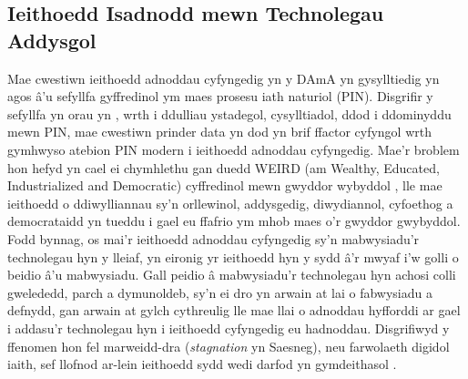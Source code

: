 \subsection{Ieithoedd Isadnodd mewn Technolegau Addysgol}
Mae cwestiwn ieithoedd adnoddau cyfyngedig yn y DAmA yn gysylltiedig yn agos â'u sefyllfa gyffredinol ym maes prosesu iath naturiol (PIN). Disgrifir y sefyllfa yn orau yn \textcite{magueresse_low-resource_2020}, wrth i ddulliau ystadegol, cysylltiadol, ddod i ddominyddu mewn PIN, mae cwestiwn prinder data yn dod yn brif ffactor cyfyngol wrth gymhwyso atebion PIN modern i ieithoedd adnoddau cyfyngedig. Mae'r broblem hon hefyd yn cael ei chymhlethu gan duedd WEIRD (am Wealthy, Educated, Industrialized and Democratic) cyffredinol mewn gwyddor wybyddol \parencite{henrich_most_2010}, lle mae ieithoedd o ddiwylliannau sy'n orllewinol, addysgedig, diwydiannol, cyfoethog a democrataidd yn tueddu i gael eu ffafrio ym mhob maes o'r gwyddor gwybyddol. Fodd bynnag, os mai'r ieithoedd adnoddau cyfyngedig sy'n mabwysiadu'r technolegau hyn y lleiaf, yn eironig yr ieithoedd hyn y sydd â'r mwyaf i'w golli o beidio â'u mabwysiadu. Gall peidio â mabwysiadu'r technolegau hyn achosi colli gwelededd, parch a dymunoldeb, sy'n ei dro yn arwain at lai o fabwysiadu a defnydd, gan arwain at gylch cythreulig lle mae llai o adnoddau hyfforddi ar gael i addasu'r technolegau hyn i ieithoedd cyfyngedig eu hadnoddau. Disgrifiwyd y ffenomen hon fel marweidd-dra (\textit{stagnation} yn Saesneg), neu farwolaeth digidol iaith, sef llofnod ar-lein ieithoedd sydd wedi darfod yn gymdeithasol \parencite{kornai_digital_2013}.


